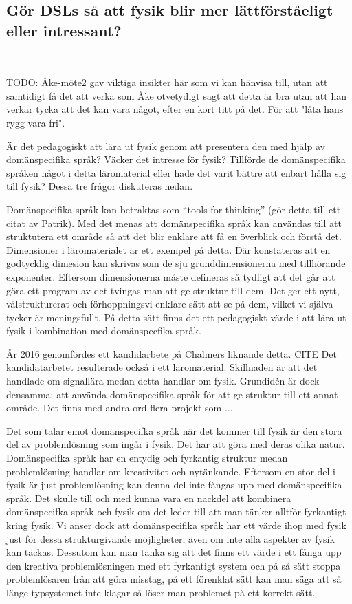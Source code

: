 \begin{binge}
\section{Gör DSLs så att fysik blir mer lättförståeligt eller
intressant?}~\label{sec:bara_fysik}

TODO: Åke-möte2 gav viktiga insikter här som vi kan hänvisa till, utan att samtidigt få det att verka som Åke otvetydigt sagt att detta är bra utan att han verkar tycka att det kan vara något, efter en kort titt på det. För att "låta hans rygg vara fri".

Är det pedagogiskt att lära ut fysik genom att presentera den med hjälp av domänspecifika språk? Väcker det intresse för fysik? Tillförde de domänspecifika språken något i detta läromaterial eller hade det varit bättre att enbart hålla sig till fysik? Dessa tre frågor diskuteras nedan.

Domänspecifika språk kan betraktas som ``tools for thinking'' (gör detta till ett citat av Patrik). Med det menas att domänspecifika språk kan användas till att struktutera ett område så att det blir enklare att få en överblick och förstå det. Dimensioner i läromaterialet är ett exempel på detta. Där konstateras att en godtycklig dimesion kan skrivas som de sju grunddimensionerna med tillhörande exponenter. Eftersom dimensionerna måste defineras så tydligt att det går att göra ett program av det tvingas man att ge struktur till dem. Det ger ett nytt, välstrukturerat och förhoppningsvi enklare sätt att se på dem, vilket vi själva tycker är meningsfullt. På detta sätt finns det ett pedagogiskt värde i att lära ut fysik i kombination med domänspecfika språk.

År 2016 genomfördes ett kandidarbete på Chalmers liknande detta. CITE Det kandidatarbetet resulterade också i ett läromaterial. Skillnaden är att det handlade om signallära medan detta handlar om fysik. Grundidėn är dock densamma: att använda domänspecifika språk för att ge struktur till ett annat område. Det finns med andra ord flera projekt som ...



Det som talar emot domänspecifka språk när det kommer till fysik är den stora del av problemlösning som ingår i fysik. Det har att göra med deras olika natur. Domänspecifka språk har en entydig och fyrkantig struktur medan problemlösning handlar om kreativitet och nytänkande. Eftersom en stor del i fysik är just problemlösning kan denna del inte fångas upp med domänspecifika språk. Det skulle till och med kunna vara en nackdel att kombinera domänspecifka språk och fysik om det leder till att man tänker alltför fyrkantigt kring fysik. Vi anser dock att domänspecifika språk har ett värde ihop med fysik just för dessa strukturgivande möjligheter, även om inte alla aspekter av fysik kan täckas. Dessutom kan man tänka sig att det finns ett värde i ett fånga upp den kreativa problemlösningen med ett fyrkantigt system och på så sätt stoppa problemlösaren från att göra misstag, på ett förenklat sätt kan man säga att så länge typsystemet inte klagar så löser man problemet på ett korrekt sätt.


\end{binge}
